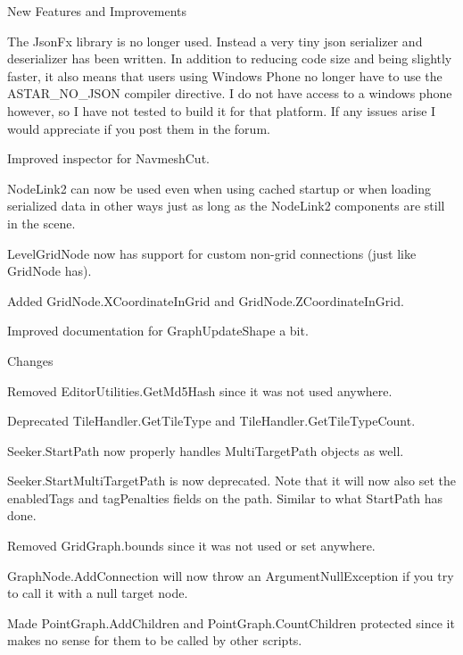 \begin{DoxyItemize}
\begin{DoxyItemize}
\begin{DoxyItemize}
\end{DoxyItemize}
\item New Features and Improvements
\begin{DoxyItemize}
\item The Json\+Fx library is no longer used. Instead a very tiny json serializer and deserializer has been written. In addition to reducing code size and being slightly faster, it also means that users using Windows Phone no longer have to use the A\+S\+T\+A\+R\+\_\+\+N\+O\+\_\+\+J\+S\+ON compiler directive. I do not have access to a windows phone however, so I have not tested to build it for that platform. If any issues arise I would appreciate if you post them in the forum.
\item Improved inspector for Navmesh\+Cut.
\item Node\+Link2 can now be used even when using cached startup or when loading serialized data in other ways just as long as the Node\+Link2 components are still in the scene.
\item Level\+Grid\+Node now has support for custom non-\/grid connections (just like Grid\+Node has).
\item Added Grid\+Node.\+X\+Coordinate\+In\+Grid and Grid\+Node.\+Z\+Coordinate\+In\+Grid.
\item Improved documentation for Graph\+Update\+Shape a bit.
\end{DoxyItemize}
\item Changes
\begin{DoxyItemize}
\item Removed Editor\+Utilities.\+Get\+Md5\+Hash since it was not used anywhere.
\item Deprecated Tile\+Handler.\+Get\+Tile\+Type and Tile\+Handler.\+Get\+Tile\+Type\+Count.
\item Seeker.\+Start\+Path now properly handles Multi\+Target\+Path objects as well.
\item Seeker.\+Start\+Multi\+Target\+Path is now deprecated. Note that it will now also set the enabled\+Tags and tag\+Penalties fields on the path. Similar to what Start\+Path has done.
\item Removed Grid\+Graph.\+bounds since it was not used or set anywhere.
\item Graph\+Node.\+Add\+Connection will now throw an Argument\+Null\+Exception if you try to call it with a null target node.
\item Made Point\+Graph.\+Add\+Children and Point\+Graph.\+Count\+Children protected since it makes no sense for them to be called by other scripts.

\end{DoxyItemize}
\end{DoxyItemize}
\end{DoxyItemize}
